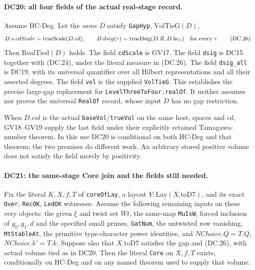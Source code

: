 \paragraph{DC20: all four fields of the actual real-stage record.}
\label{claim:DC20}
Assume HC-Deg.  Let the \emph{same} $D$ satisfy
\texttt{GapHyp}, $\mathrm{VolTieG}(D)$,
\[
 D.s.cdScale=\mathrm{trueScale}(D.cd),\qquad
 D.dsig(\tau)=\mathrm{trueDsig}(D.R,D.\mathrm{hc}_\tau)
                    \quad\hbox{for every }\tau.               \tag{DC.26}
\]
Then $\mathrm{RealTied}(D)$ holds.  The field \texttt{cdScale}
is GV17.  The field \texttt{dsig} is DC15 together with
(DC.24), under the literal measure in (DC.26).  The field
\texttt{dsig\_all} is DC19, with its universal quantifier over
all Hilbert representations and all their asserted degrees.
The field \texttt{vol} is the supplied \texttt{VolTieG}.
This establishes the precise large-gap replacement for
\texttt{LevelThreeToFour.realOf}.  It neither assumes nor proves
the universal \texttt{RealOf} record, whose input $D$ has no
gap restriction.

When $D.vol$ is the actual \texttt{baseVol}/\texttt{trueVol}
on the same host, spaces and $cd$, GV18--GV19 supply the last
field under their explicitly retained Tamagawa-number theorem.
In this use DC20 is conditional on both HC-Deg and that theorem;
the two premises do different work.  An arbitrary stored
positive volume does not satisfy the field merely by positivity.

\paragraph{DC21: the same-stage Core join and the fields still needed.}
\label{claim:DC21}
Fix the literal $K,X,f,T$ of \texttt{coreOfLay}, a layout
$Y:\mathrm{Lay}(X.\mathrm{toD7})$, and its exact
\texttt{Over}, \texttt{RecOK}, \texttt{LedOK} witnesses.
Assume the following remaining inputs on these very objects:
the given $\xi$ and twist set $Wt$, the same-map \texttt{MuIsW},
forced inclusion of $g_0,g_1,d$ and the specified small primes,
\texttt{GatNum}, the untwisted row vanishing, \texttt{MtStableAt},
the primitive type-character power identities, and
$NChoice.Q=T.Q$, $NChoice.k'=T.k$.  Suppose also that $X.\mathrm{toD7}$
satisfies the gap and (DC.26), with actual volume tied as in DC20.
Then the literal \texttt{Core} on $X,f,T$ exists, conditionally
on HC-Deg and on any named theorem used to supply that volume.

